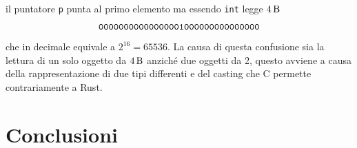 \documentclass[Lau,binding=0.6cm]{sapthesis}
\newcommand{\textcode}[1]{\colorbox{backcolour}{\texttt{#1}}}
\begin{document}
il puntatore \texttt{p} punta al primo elemento ma essendo \textcode{int} legge $ \SI{4}{\byte} $  
\[
\texttt{00000000000000001000000000000000} \\
\]
che in decimale equivale a $ 2^{16} = 65536 $. La causa di questa confusione sia la lettura di un solo oggetto da $\SI{4}{\byte} $ anziché due oggetti da 2, questo avviene a causa della rappresentazione di due tipi differenti e del casting che C permette contrariamente a Rust.




\chapter{Conclusioni}

%
%

\backmatter

\cleardoublepage
{}
{}
\end{document}
